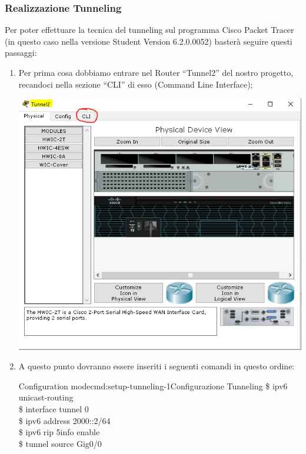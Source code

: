 \subsubsection{Realizzazione Tunneling}
Per poter effettuare la tecnica del tunneling sul programma Cisco Packet Tracer (in questo caso nella versione Student Version 6.2.0.0052) basterà seguire questi passaggi:

\begin{enumerate}
    \item Per prima cosa dobbiamo entrare nel Router “Tunnel2” del nostro progetto, recandoci nella sezione “CLI” di esso (Command Line Interface);\par
    \begin{center}
        \includegraphics[width=\linewidth]{images/07.routing-sicurezza/tunneling/10.png}
    \end{center}
    \item A questo punto dovranno essere inseriti i seguenti comandi in questo ordine:\par
    \begin{cmds}{Configuration mode}{cmd:setup-tunneling-1}{Configurazione Tunneling}
        \$ ipv6 unicast-routing\\
        \$ interface tunnel 0\\
        \$ ipv6 address 2000::2/64\\
        \$ ipv6 rip 5info enable\\
        \$ tunnel source Gig0/0\\

\end{cmds}
\end{enumerate}
